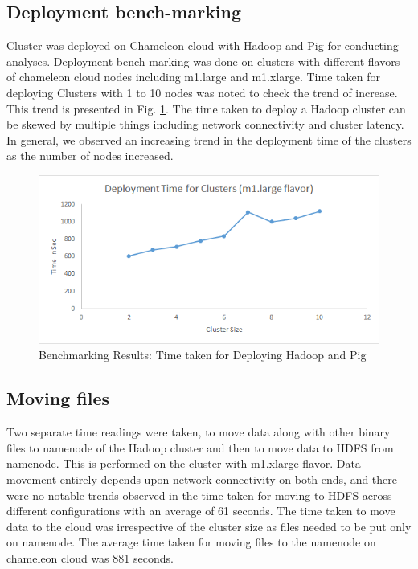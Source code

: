 \documentclass[9pt,twocolumn,twoside]{../../styles/osajnl}
\begin{document}
\subsection{Deployment bench-marking}
Cluster was deployed on Chameleon cloud with Hadoop and Pig for conducting analyses. Deployment bench-marking was done on clusters with different flavors of chameleon cloud nodes including m1.large and m1.xlarge. Time taken for deploying Clusters with 1 to 10 nodes was noted to check the trend of increase. This trend is presented in Fig. \ref{fig:dep_time}. The time taken to deploy a Hadoop cluster can be skewed by multiple things including network connectivity and cluster latency. In general, we observed an increasing trend in the deployment time of the clusters as the number of nodes increased. 

\begin{figure}[hptb]
\centering
\includegraphics[width=\linewidth]{images/dep_time.png}
\caption{ Benchmarking Results: Time taken for Deploying Hadoop and Pig}
\label{fig:dep_time}
\end{figure}
\subsection{Moving files}
Two separate time readings were taken, to move data along with other binary files to namenode of the Hadoop cluster and then to move data to HDFS from namenode. This is performed on the cluster with m1.xlarge flavor. Data movement entirely depends upon network connectivity on both ends, and there were no notable trends observed in the time taken for moving to HDFS across different configurations with an average of 61 seconds. The time taken to move data to the cloud was irrespective of the cluster size as files needed to be put only on namenode. The average time taken for moving files to the namenode on chameleon cloud was 881 seconds. 
\end{document}
